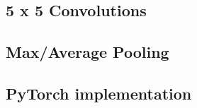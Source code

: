 \begin{solution}

\end{solution}

\newpage


\subsection{5 x 5 Convolutions}


\problem[2]

\begin{subsolution}

\end{subsolution}

\newpage


\problem[3]

\begin{subsolution}

\end{subsolution}

\newpage


 \subsection{Max/Average Pooling}

\problem[3]

\begin{subsolution}

\end{subsolution}

\newpage


\problem[3]

\begin{subsolution}

\end{subsolution}

\newpage


\problem[4]

\begin{subsolution}

\end{subsolution}

\newpage


\subsection{PyTorch implementation}
\problem[20]


\begin{subsolution}

\end{subsolution}


